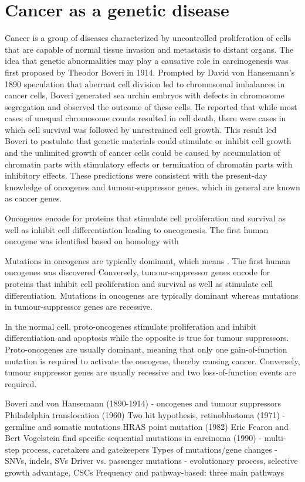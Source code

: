 \section{Cancer as a genetic disease}
\label{sec:Cancerasageneticdisease}

Cancer is a group of diseases characterized by uncontrolled proliferation of cells that are capable of normal tissue invasion and metastasis to distant organs. The idea that genetic abnormalities may play a causative role in carcinogenesis was first proposed by Theodor Boveri in 1914. Prompted by David von Hansemann's 1890 speculation that aberrant cell division led to chromosomal imbalances in cancer cells, Boveri generated sea urchin embryos with defects in chromosome segregation and observed the outcome of these cells. He reported that while most cases of unequal chromosome counts resulted in cell death, there were cases in which cell survival was followed by unrestrained cell growth. This result led Boveri to postulate that genetic materials could stimulate or inhibit cell growth and the unlimited growth of cancer cells could be caused by accumulation of chromatin parts with stimulatory effects or termination of chromatin parts with inhibitory effects. These predictions were consistent with the present-day knowledge of oncogenes and tumour-suppressor genes, which in general are known as cancer genes.

Oncogenes encode for proteins that stimulate cell proliferation and survival as well as inhibit cell differentiation leading to oncogenesis. The first human oncogene was identified based on homology with

Mutations in oncogenes are typically dominant, which means . The first human oncogenes was discovered Conversely, tumour-suppressor genes encode for proteins that inhibit cell proliferation and survival as well as stimulate cell differentiation. Mutations in oncogenes are typically dominant whereas mutations in tumour-suppressor genes are recessive.

In the normal cell, proto-oncogenes stimulate proliferation and inhibit differentiation and apoptosis while the opposite is true for tumour suppressors. Proto-oncogenes are usually dominant, meaning that only one gain-of-function mutation is required to activate the oncogene, thereby causing cancer. Conversely, tumour suppressor genes are usually recessive and two loss-of-function events are required.

Boveri and von Hansemann (1890-1914) - oncogenes and tumour suppressors
Philadelphia translocation (1960)
Two hit hypothesis, retinoblastoma (1971) - germline and somatic mutations
HRAS point mutation (1982)
Eric Fearon and Bert Vogelstein find specific sequential mutations in carcinoma (1990) - multi-step process, caretakers and gatekeepers
Types of mutations/gene changes - SNVs, indels, SVs
Driver vs. passenger mutations - evolutionary process, selective growth advantage, CSCs
Frequency and pathway-based: three main pathways

